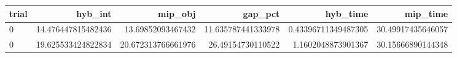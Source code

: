 \begin{tabular}{lrrrrr}
\hline
trial & hyb_int & mip_obj & gap_pct & hyb_time & mip_time \\ \hline
0 & 14.476447815482436 & 13.69852093467432 & 11.635787441333978 & 0.43396711349487305 & 30.49917435646057 \\
0 & 19.625533424822834 & 20.672313766661976 & 26.49154730110522 & 1.1602048873901367 & 30.15666890144348 \\
\hline
\end{tabular}
